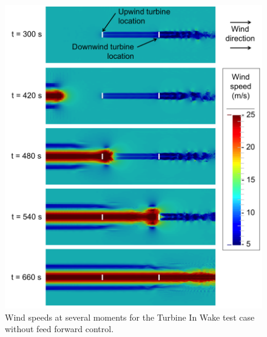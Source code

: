  \begin{figure}[hp] 
	\centering
		\includegraphics[width = \linewidth]{Figures/ch6Figures/fig6-27.png}

	\caption{Wind speeds at several moments for the Turbine In Wake test case without feed forward control.}
	\label{fig6-27} 
\end{figure}

